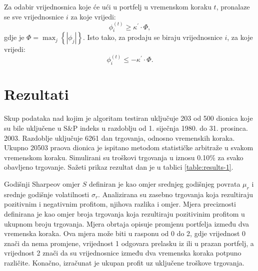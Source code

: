 \documentclass[lmodern, utf8, diplomski, numeric]{fer}
\begin{document}
  Za odabir vrijednosnica koje će ući u portfelj u vremenskom koraku $t$, pronalaze se sve vrijednosnice $i$ za koje vrijedi:
  \begin{equation}
  \phi_i^{\left(t\right)} \ge \kappa^\prime \cdot \Phi,
  \end{equation}
  gdje je $\Phi = \max_j \left\{ \left| \phi_j \right| \right\}$.
  Isto tako, za prodaju se biraju vrijednosnice $i$, za koje vrijedi:
  \begin{equation}
  \phi_i^{\left(t\right)} \le -\kappa^\prime \cdot \Phi.
  \end{equation}
  
  \chapter{Rezultati}
  Skup podataka nad kojim je algoritam testiran uključuje 203 od 500 dionica koje su bile uključene u S\&P indeks u razdoblju od 1. siječnja 1980. do 31. prosinca. 2003.
  Razdoblje uključuje 6261 dan trgovanja, odnosno vremenskih koraka.
  Ukupno 20503 praova dionica je ispitano metodom statističke arbitraže u svakom vremenskom koraku.
  Simulirani su troškovi trgovanja u iznosu 0.10\% za svako obavljeno trgovanje.
  Sažeti prikaz rezultat dan je u tablici \ref{table:results-1}.
  
  Godišnji Sharpeov omjer $S$ definiran je kao omjer srednjeg godišnjeg povrata $\mu_r$ i srednje godišnje volatilnosti $\sigma_r$.
  Analizirana su zasebno trgovanja koja rezultiraju pozitivnim i negativnim profitom, njihova razlika i omjer.
  Mjera preciznosti definirana je kao omjer broja trgovanja koja rezultiraju pozitivinim profitom u ukupnom broju trgovanja.
  Mjera obrtaja  opisuje promjenu portfelja između dva vremenska koraka.
  Ova mjera može biti u rasponu od 0 do 2, gdje vrijednost 0 znači da nema promjene, vrijednost 1 odgovara prelasku iz ili u prazan portfelj, a vrijednost 2 znači da su vrijednosnice između dva vremenska koraka potpuno različite.
  Konačno, izračunat je ukupan profit uz uključene troškove trgovanja.
  
\end{document}
